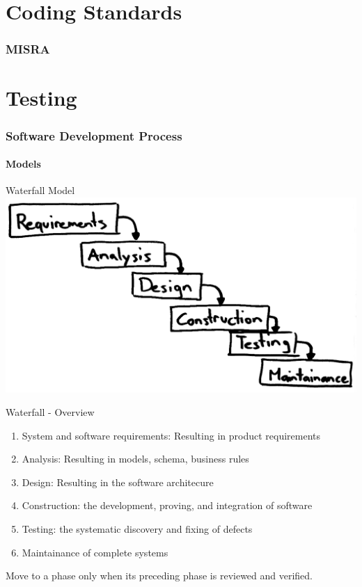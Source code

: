 \documentclass{beamer}
\begin{document}
\part{Coding Standards}
\section{MISRA}
\begin{frame}

\end{frame}


\part{Testing}

\section{Software Development Process}

\subsection{Models}

\begin{frame}{Waterfall Model}
\includegraphics[scale=0.3]{img/Waterfall.png}
\end{frame}

\begin{frame}{Waterfall - Overview}
\begin{enumerate}
  \item System and software requirements: Resulting in product requirements
  \item Analysis: Resulting in models, schema, business rules
  \item Design: Resulting in  the software architecure
  \item Construction: the development, proving, and integration of software
  \item Testing: the systematic discovery and fixing of defects
  \item Maintainance of complete systems
\end{enumerate}
Move to a phase only when its preceding phase is reviewed and verified.
\end{frame}
\end{document}
